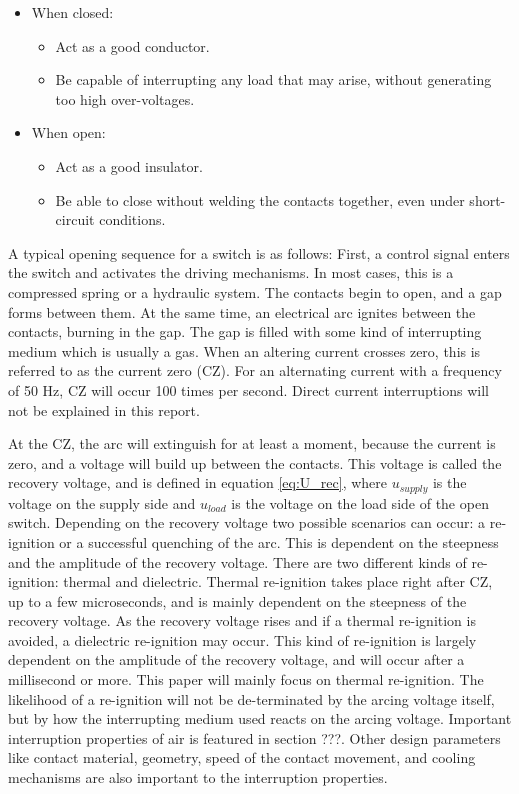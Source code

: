 \documentclass[10pt,b5paper,twoside]{article}
\begin{document}
\begin{itemize}
\item When closed:
	\begin{itemize}
		\item Act as a good conductor.
		\item Be capable of interrupting any load that may arise, without generating too high over-voltages. 
	\end{itemize}
\item When open:
	\begin{itemize}
		\item Act as a good insulator.
		\item Be able to close without welding the contacts together, even under short-circuit conditions.
	\end{itemize}
\end{itemize}

A typical opening sequence for a switch is as follows: First, a control signal enters the switch and activates the driving mechanisms. In most cases, this is a compressed spring or a hydraulic system. The contacts begin to open, and a gap forms between them. At the same time, an electrical arc ignites between the contacts, burning in the gap. The gap is filled with some kind of interrupting medium which is usually a gas. When an altering current crosses zero, this is referred to as the current zero (CZ). For an alternating current with a frequency of 50 Hz, CZ will occur 100 times per second. Direct current interruptions will not be explained in this report.


At the CZ, the arc will extinguish for at least a moment, because the current is zero, and a voltage will build up between the contacts. This voltage is called the recovery voltage, and is defined in equation \eqref{eq:U_rec}, where $u_{supply}$ is the voltage on the supply side and $u_{load}$ is the voltage on the load side of the open switch. Depending on the recovery voltage two possible scenarios can occur: a re-ignition or a successful quenching of the arc. This is dependent on the steepness and the amplitude of the recovery voltage. There are two different kinds of re-ignition: thermal and dielectric. Thermal re-ignition takes place right after CZ, up to a few microseconds, and is mainly dependent on the steepness of the recovery voltage. As the recovery voltage rises and if a thermal re-ignition is avoided, a dielectric re-ignition may occur. This kind of re-ignition is largely dependent on the amplitude of the recovery voltage, and will occur after a millisecond or more. This paper will mainly focus on thermal re-ignition. The likelihood of a re-ignition  will not be de-terminated by the arcing voltage itself, but by how the interrupting medium used reacts on the arcing voltage. Important interruption properties of air is featured in section ???. Other design parameters like contact material, geometry, speed of the contact movement, and cooling mechanisms are also important to the interruption properties.
\end{document}
